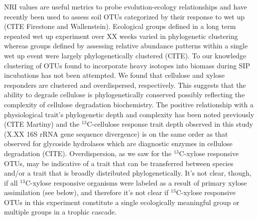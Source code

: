 NRI values are useful metrics to probe evolution-ecology relationships and have
recently been used to assess soil OTUs categorized by their response to wet up
(CITE Firestone and Wallenstein). Ecological groups defined in a long term
repeated wet up experiment over XX weeks varied in phylogenetic clustering
whereas groups defined by assessing relative abundance patterns within a single
wet up event were largely phylogenetically clustered (CITE). To our knowledge
clustering of OTUs found to incorporate heavy isotopes into biomass during SIP
incubations has not been attempted. We found that cellulose and xylose
responders are clustered and overdispersed, respectively. This suggests that
the ability to degrade cellulose is phylogenetically conserved possibly
reflecting the complexity of cellulose degradation biochemistry. The positive
relationship with a physiological trait's phylogenetic depth and complexity has
been noted previously (CITE Martiny) and the $^{13}$C-cellulose response trait
depth observed in this study (X.XX 16S rRNA gene sequence divergence) is on the
same order as that observed for glycoside hydrolases which are diagnostic
enzymes in cellulose degradation (CITE). Overdispersion, as we saw for the
$^{13}$C-xylose responsive OTUs, may be indicative of a trait that can be
transferred between species and/or a trait that is broadly distributed
phylogenetically. It's not clear, though, if all $^{13}$C-xylose responsive
organisms were labeled as a result of primary xylose assimilation (see below),
and therefore it's not clear if $^{13}$C-xylose responsive OTUs in this
experiment constitute a single ecologically meaningful group or multiple groups
in a trophic cascade. 


